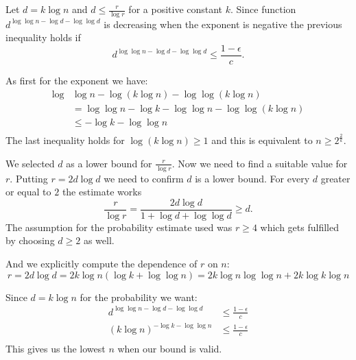 Let $d = k \log n$ and $d \leq \frac{r}{\log r}$ for a positive constant $k$. Since function $d^{\log \log n -\log d - \log \log d}$ is decreasing when the exponent is negative the previous inequality holds if
\begin{displaymath}
d ^ {\log \log n - \log d -\log \log d} \leq \frac{1 - \epsilon}{c}\textit{.}
\end{displaymath}

As first for the exponent we have:
\begin{displaymath}
\begin{split}
\log & \log n - \log (k \log n) - \log \log (k \log n) \\
	& = \log \log n - \log k - \log\log n - \log \log (k \log n) \\
	& \leq - \log k - \log \log n \\
\end{split}
\end{displaymath}
The last inequality holds for $\log (k \log n) \geq 1$ and this is equivalent to $n \geq 2^{\frac{2}{k}}$.

We selected $d$ as a lower bound for $\frac{r}{\log r}$. Now we need to find a suitable value for $r$. Putting $r = 2 d \log d$ we need to confirm $d$ is a lower bound. For every $d$ greater or equal to $2$ the estimate works
\begin{displaymath}
\frac{r}{\log r} = \frac{2 d \log d}{1 + \log d + \log \log d} \geq d \textit{.}
\end{displaymath}
The assumption for the probability estimate used was $r \geq 4$ which gets fulfilled by choosing $d \geq 2$ as well.

And we explicitly compute the dependence of $r$ on $n$:
\begin{displaymath}
r = 2 d \log d = 2 k \log n (\log k + \log \log n) = 2 k \log n \log \log n + 2 k \log k \log n
\end{displaymath}



Since $d = k \log n$ for the probability we want:
\begin{displaymath}
\begin{split}
d ^ {\log \log n - \log d -\log \log d} & \leq \frac{1 - \epsilon}{c} \\
\left(k \log n\right)^{-\log k -\log \log n} & \leq \frac{1 - \epsilon}{c} \\
\end{split}
\end{displaymath}
This gives us the lowest $n$ when our bound is valid. 

